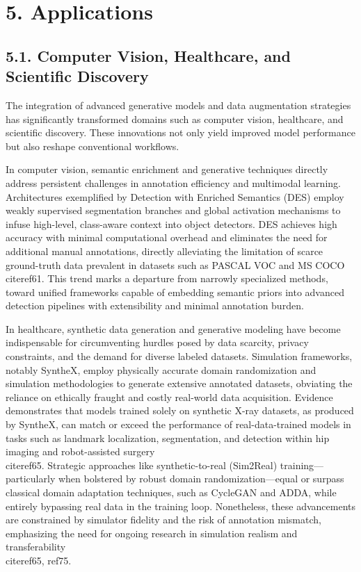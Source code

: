 \documentclass[11pt]{article}
\begin{document}
\section{5. Applications}

\subsection{5.1. Computer Vision, Healthcare, and Scientific Discovery}

The integration of advanced generative models and data augmentation strategies has significantly transformed domains such as computer vision, healthcare, and scientific discovery. These innovations not only yield improved model performance but also reshape conventional workflows.

In computer vision, semantic enrichment and generative techniques directly address persistent challenges in annotation efficiency and multimodal learning. Architectures exemplified by Detection with Enriched Semantics (DES) employ weakly supervised segmentation branches and global activation mechanisms to infuse high-level, class-aware context into object detectors. DES achieves high accuracy with minimal computational overhead and eliminates the need for additional manual annotations, directly alleviating the limitation of scarce ground-truth data prevalent in datasets such as PASCAL VOC and MS COCO~\\cite{ref61}. This trend marks a departure from narrowly specialized methods, toward unified frameworks capable of embedding semantic priors into advanced detection pipelines with extensibility and minimal annotation burden.

In healthcare, synthetic data generation and generative modeling have become indispensable for circumventing hurdles posed by data scarcity, privacy constraints, and the demand for diverse labeled datasets. Simulation frameworks, notably SyntheX, employ physically accurate domain randomization and simulation methodologies to generate extensive annotated datasets, obviating the reliance on ethically fraught and costly real-world data acquisition. Evidence demonstrates that models trained solely on synthetic X-ray datasets, as produced by SyntheX, can match or exceed the performance of real-data-trained models in tasks such as landmark localization, segmentation, and detection within hip imaging and robot-assisted surgery~\\cite{ref65}. Strategic approaches like synthetic-to-real (Sim2Real) training—particularly when bolstered by robust domain randomization—equal or surpass classical domain adaptation techniques, such as CycleGAN and ADDA, while entirely bypassing real data in the training loop. Nonetheless, these advancements are constrained by simulator fidelity and the risk of annotation mismatch, emphasizing the need for ongoing research in simulation realism and transferability~\\cite{ref65, ref75}.
\end{document}
